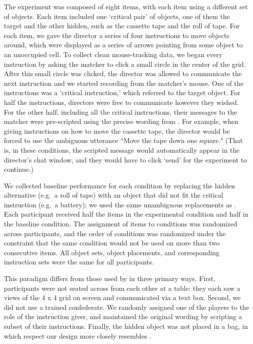 \documentclass[10pt,letterpaper]{article}
\begin{document}
The experiment was composed of eight items, with each item using a different set of objects. Each item included one `critical pair' of objects, one of them the target and the other hidden, such as the cassette tape and the roll of tape. For each item, we gave the director a series of four instructions to move objects around, which were displayed as a series of arrows pointing from some object to an unoccupied cell. 
To collect clean mouse-tracking data, we began every instruction by asking the matcher to click a small circle in the center of the grid. After this small circle was clicked, the director was allowed to communicate the next instruction and we started recording from the matcher's mouse. 
One of the instructions was a `critical instruction,' which referred to the target object.
For half the instructions, directors were free to communicate however they wished. For the other half, including all the critical instructions, their messages to the matcher were pre-scripted using the precise wording from . For example, when giving instructions on how to move the cassette tape, the director would be forced to use the ambiguous utterance ``Move the tape down one square." (That is, in these conditions, the scripted message would automatically appear in the director's chat window, and they would have to click `send' for the experiment to continue.)

We collected baseline performance for each condition by replacing the hidden alternative (e.g.~a roll of tape) with an object that did not fit the critical instruction (e.g.~a battery); we used the same unambiguous replacements as . Each participant received half the items in the experimental condition and half in the baseline condition. The assignment of items to conditions was randomized across participants, and the order of conditions was randomized under the constraint that the same condition would not be used on more than two consecutive items. All object sets, object placements, and corresponding instruction sets were the same for all participants.

This paradigm differs from those used by  in three primary ways. First, participants were not seated across from each other at a table: they each saw a views of the 4 x 4 grid on screen and communicated via a text box. Second, we did not use a trained confederate. We randomly assigned one of the players to the role of the instruction giver, and maintained the original wording by scripting a subset of their instructions. Finally, the hidden object was not placed in a bag, in which respect our design more closely resembles .
\end{document}
